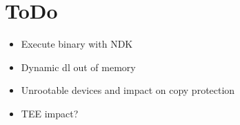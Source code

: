 \chapter{ToDo}

\begin{itemize}
\item Execute binary with NDK
\item Dynamic dl out of memory
\item Unrootable devices and impact on copy protection
\item TEE impact?
\end{itemize}